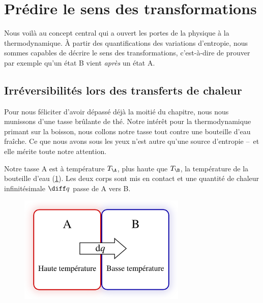 \section{Prédire le sens des transformations}

	Nous voilà au concept central qui a ouvert les portes de la physique à la thermodynamique. À partir des quantifications des variations d’entropie, nous sommes capables de décrire le sens des transformations, c’est-à-dire de prouver par exemple qu’un état B vient \emph{après} un état A. 

	\subsection{Irréversibilités lors des transferts de chaleur}

		Pour nous féliciter d’avoir dépassé déjà la moitié du chapitre, nous nous munissons d’une tasse brûlante de thé. Notre intérêt pour la thermodynamique primant sur la boisson, nous collons notre tasse tout contre une bouteille d’eau fraîche. Ce que nous avons sous les yeux n’est autre qu’une source d’entropie --\ et elle mérite toute notre attention.

		Notre tasse A est à température $T_\A$, plus haute que $T_\B$, la température de la bouteille d’eau (\cref{fig_expérience_création_entropie}). Les deux corps sont mis en contact et une quantité de chaleur infinitésimale $\diff q$ passe de A vers B.

		\begin{figure}
			\begin{center}
				\includegraphics[width=8cm]{images/transfert_chaleur_irreversible.png}
			\end{center}
			\label{fig_expérience_création_entropie}
		\end{figure}


